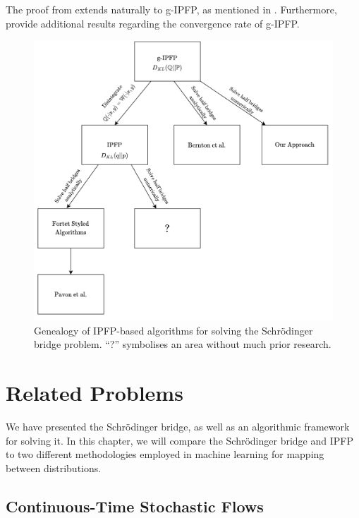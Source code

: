 \documentclass[a4paper,12pt,twoside,openright]{report}
\theoremstyle{definition}
\begin{document}
The proof from \cite{ruschendorf1995convergence} extends naturally to g-IPFP, as mentioned in \cite{bernton2019schr}. Furthermore, \cite{bernton2019schr} provide additional results regarding the convergence rate of g-IPFP.
\begin{figure}[h!]
    \centering
    \includegraphics[width=\linewidth]{images/IPFP_Geanology.png}
    \caption{Genealogy of IPFP-based algorithms for solving the Schrödinger bridge problem. ``?'' symbolises an area without much prior research.}
    \label{fig:genealogy}
\end{figure}

\chapter{Related Problems}
We have presented the Schrödinger bridge, as well as an algorithmic framework for solving it. In this chapter, we will compare the Schrödinger bridge and IPFP to two different methodologies employed in machine learning for mapping between distributions. 
\section{Continuous-Time Stochastic Flows}
\end{document}
